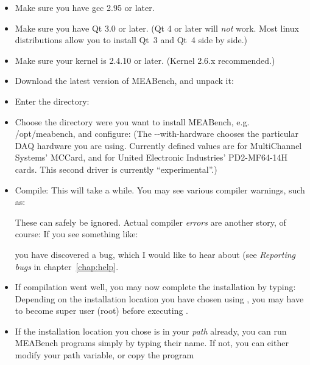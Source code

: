 \documentclass[12pt,oneside]{book}
\def\meabench{{MEABench}\xspace}
\def\filename#1{{\sf #1}\xspace}
\begin{document}
\begin{itemize}
\item Make sure you have gcc 2.95 or later.
\item Make sure you have Qt 3.0 or later. (Qt 4 or later will \emph{not} work. Most linux distributions allow you to install Qt~3 and Qt~4 side by side.)
\item Make sure your kernel is 2.4.10 or later. (Kernel 2.6.x recommended.)
\item Download the latest version of \meabench, and unpack it:
\item Enter the directory:
\item Choose the directory were you want to install \meabench, e.g.
  \filename{/opt/meabench}, and configure:
(The \filename{-{}-with-hardware} chooses the particular DAQ hardware
you are using. Currently defined values are  for MultiChannel
Systems' MCCard, and  for United Electronic Industries'
PD2-MF64-14H cards. This second driver is currently ``experimental''.)
\item Compile:
This will take a while. You may see various compiler warnings, such
as: 
\begin{quotation}\end{quotation}
These can safely be ignored. Actual compiler {\it errors} are another story,
of course: If you see something like:
\begin{quotation}\end{quotation}
you have discovered a bug, which I would like to hear about (see
\emph{Reporting bugs} in chapter~\ref{chap:help}.
\item If compilation went well, you may now complete the installation
by typing:
Depending on the installation location you have chosen using
, you may have to become super user (root)
before executing .
\item If the installation location you chose is in your {\it path}
already, you can run \meabench programs simply by typing their name. 
If not, you can either modify your path variable, or copy the program

\end{itemize}
\end{document}
